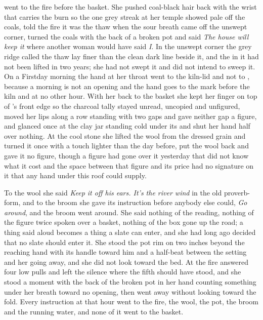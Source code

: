  went to the fire before the basket. She pushed coal-black hair back with the wrist that carries the burn so the one grey streak at her temple showed pale off the coals, told the fire it was the thaw when the sour breath came off the unswept corner, turned the coals with the back of a broken pot and said \emph{The house will keep it} where another woman would have said \emph{I}. In the unswept corner the grey ridge called the thaw lay finer than the clean dark line beside it, and the  in it had not been lifted in two years; she had not swept it and did not intend to sweep it. On a Firstday morning the hand at her throat went to the kiln-lid and not to , because a morning is not an opening and the hand goes to the mark before the kiln and at no other hour. With her back to the basket she kept her finger on top of 's front edge so the charcoal tally stayed unread, uncopied and unfigured, moved her lips along a row standing with two gaps and gave neither gap a figure, and glanced once at the clay jar standing cold under its  and shut her hand half over nothing. At the cool stone she lifted the wool from the dressed grain and turned it once with a touch lighter than the day before, put the wool back and gave it no figure, though a figure had gone over it yesterday that did not know what it cost and the space between that figure and its price had no signature on it that any hand under this roof could supply.

To the wool she said \emph{Keep it off his ears. It's the river wind} in the old proverb-form, and to the broom she gave its instruction before anybody else could, \emph{Go around}, and the broom went around. She said nothing of the reading, nothing of the figure twice spoken over a basket, nothing of the box gone up the road; a thing said aloud becomes a thing a slate can enter, and she had long ago decided that no slate should enter it. She stood the pot rim on  two inches beyond the reaching hand with its handle toward him and a half-beat between the setting and her going away, and she did not look toward the bed. At  the fire answered four low pulls and left the silence where the fifth should have stood, and she stood a moment with the back of the broken pot in her hand counting something under her breath toward no opening, then went away without looking toward the fold. Every instruction at that hour went to the fire, the wool, the pot, the broom and the running water, and none of it went to the basket.

